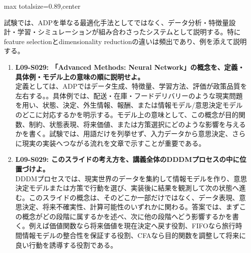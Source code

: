 \begin{minipage}[t]{0.58\textwidth}
\begin{adjustbox}{max totalsize={\textwidth}{0.89\textheight},center}
\begin{minipage}{\textwidth}
試験では、ADPを単なる最適化手法としてではなく、データ分析・特徴量設計・学習・シミュレーションが組み合わさったシステムとして説明する。特にfeature selectionとdimensionality reductionの違いは頻出であり、例を添えて説明する。\par{}\begin{enumerate}\item \textbf{L09-S029: 「Advanced Methods: Neural Network」の概念を、定義・具体例・モデル上の意味の順に説明せよ。}\\定義としては、ADPではデータ生成、特徴量、学習方法、評価が政策品質を左右する。。具体例では、配送・在庫・フードデリバリーのような現実問題を用い、状態、決定、外生情報、報酬、または情報モデル/意思決定モデルのどこに対応するかを明示する。モデル上の意味として、この概念が目的関数、制約、状態表現、将来価値、または方策選択にどのような影響を与えるかを書く。試験では、用語だけを列挙せず、入力データから意思決定、さらに現実の実装へつながる流れを文章で示すことが重要である。\item \textbf{L09-S029: このスライドの考え方を、講義全体のDDDMプロセスの中に位置づけよ。}\\DDDMプロセスでは、現実世界のデータを集約して情報モデルを作り、意思決定モデルまたは方策で行動を選び、実装後に結果を観測して次の状態へ進む。このスライドの概念は、そのどこか一部だけではなく、データ表現、意思決定、将来不確実性、計算可能性のいずれかに関わる。答案では、まずこの概念がどの段階に属するかを述べ、次に他の段階へどう影響するかを書く。例えば価値関数なら将来価値を現在決定へ戻す役割、FIFOなら旅行時間情報モデルの整合性を保証する役割、CFAなら目的関数を調整して将来に良い行動を誘導する役割である。\end{enumerate}
\end{minipage}
\end{adjustbox}
\end{minipage}


